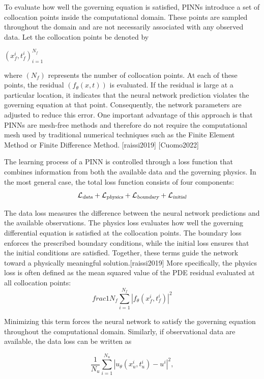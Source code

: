 \documentclass[11pt]{article}
\begin{document}
To evaluate how well the governing equation is satisfied, 
PINNs introduce a set of collocation points inside the computational domain. 
These points are sampled throughout the domain and are not necessarily 
associated with any observed data. Let the collocation points be denoted by

${(x_f^i,t_f^i)}_{i=1}^{N_f}$

where $(N_f)$ represents the number of collocation points. 
At each of these points, the residual $(f_\theta(x,t))$ is evaluated. If the residual is large at a particular location, it indicates that the neural network 
prediction violates the governing 
equation at that point. Consequently, the network parameters are 
adjusted to reduce this error. One important advantage of this approach is 
that PINNs are mesh-free methods and therefore do not require the computational mesh used by traditional 
numerical techniques such as the Finite Element Method or Finite Difference Method. [raissi2019] [Cuomo2022]


The learning process of a PINN is controlled through a loss function that combines 
information from both the available data and the governing physics. 
In the most general case, the total loss function consists of four components:
$$
\mathcal{L_{\textsl{data}}}
+
\mathcal{L_{\textsl{physics}}}
+
\mathcal{L_{\textsl{boundary}}}
+
\mathcal{L_{\textsl{initial}}}
$$

The data loss measures the difference between the neural network 
predictions and the available observations. The physics loss 
evaluates how well the governing differential equation is 
satisfied at the collocation points. The boundary loss enforces 
the prescribed boundary conditions, while the initial loss 
ensures that the initial conditions are satisfied. Together, 
these terms guide the network toward a physically meaningful solution.[raissi2019]
More specifically, the physics loss is often defined as the mean squared value of 
the PDE residual evaluated at all collocation points:
\begin{equation}
frac{1}{N_f}
\sum_{i=1}^{N_f}
\left|
f_\theta(x_f^i,t_f^i)
\right|^2
\end{equation}


Minimizing this term forces the neural network to satisfy the 
governing equation throughout the computational domain. Similarly, 
if observational data are available, the data loss can be written as


\begin{equation}
\frac{1}{N_u}
\sum_{i=1}^{N_u}
\left|
u_\theta(x_u^i,t_u^i)-u^i
\right|^2,
\end{equation}
\end{document}
